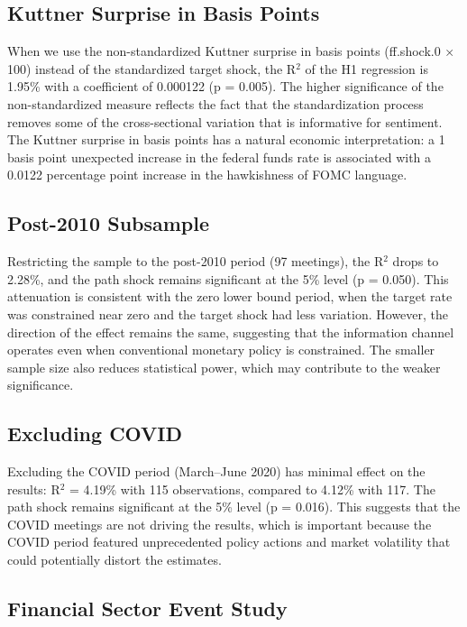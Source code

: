 \documentclass[12pt]{article}
\begin{document}
\subsection{Kuttner Surprise in Basis Points}

When we use the non-standardized Kuttner surprise in basis points (ff.shock.0 × 100) instead of the standardized target shock, the R$^2$ of the H1 regression is 1.95\% with a coefficient of 0.000122 (p = 0.005). The higher significance of the non-standardized measure reflects the fact that the standardization process removes some of the cross-sectional variation that is informative for sentiment. The Kuttner surprise in basis points has a natural economic interpretation: a 1 basis point unexpected increase in the federal funds rate is associated with a 0.0122 percentage point increase in the hawkishness of FOMC language.

\subsection{Post-2010 Subsample}

Restricting the sample to the post-2010 period (97 meetings), the R$^2$ drops to 2.28\%, and the path shock remains significant at the 5\% level (p = 0.050). This attenuation is consistent with the zero lower bound period, when the target rate was constrained near zero and the target shock had less variation. However, the direction of the effect remains the same, suggesting that the information channel operates even when conventional monetary policy is constrained. The smaller sample size also reduces statistical power, which may contribute to the weaker significance.

\subsection{Excluding COVID}

Excluding the COVID period (March--June 2020) has minimal effect on the results: R$^2$ = 4.19\% with 115 observations, compared to 4.12\% with 117. The path shock remains significant at the 5\% level (p = 0.016). This suggests that the COVID meetings are not driving the results, which is important because the COVID period featured unprecedented policy actions and market volatility that could potentially distort the estimates.

\subsection{Financial Sector Event Study}
\end{document}
